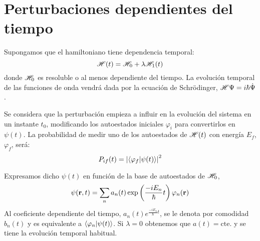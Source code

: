 \chapter{Perturbaciones dependientes del tiempo}
Supongamos que el hamiltoniano tiene dependencia temporal:
\begin{equation}
  \mathscr{H}(t) = \mathscr{H}_0 + \lambda \mathscr{H}_1(t)
\end{equation}
donde $\mathscr{H}_0$ es resoluble o al menos dependiente del tiempo. La
evolución temporal de las funciones de onda vendrá dada por la
ecuación de Schrödinger, $\mathscr{H} \Psi= i \hbar \dot \Psi$.

Se considera que la perturbación empieza a influir en la
evolución del sistema en un instante $t_0$, modificando los
autoestados iniciales $\varphi_i$ para convertirlos en $\psi(t)$. La
probabilidad de medir uno de los autoestados de $\mathscr{H}(t)$ con energía
$E_f$, $\varphi_f$, será:
\begin{equation}
  P_{if}(t)=\abs{\braket{\varphi_f}{\psi(t)}}^2
\end{equation}

Expresamos dicho $\psi(t)$ en función de la base de autoestados de
$\mathscr{H}_0$,
\begin{equation}
  \psi(\bm{\mathrm{r}},t) = \sum_{n} a_n(t) \exp \left( \frac{-i E_n
    }{\hbar} t \right) \varphi_n(\bm{\mathrm{r}})
\label{eq:psitemp}
\end{equation}
Al coeficiente dependiente
del tiempo, $a_n(t) e^{\frac{-iE_n}{\hbar}t}$, se le denota por comodidad $b_n(t)$ y es
equivalente a $\braket{\varphi_n}{\psi(t)}$. Si $\lambda=0$ obtenemos que $a(t) =
\text{cte.}$ y se tiene la evolución temporal habitual.

